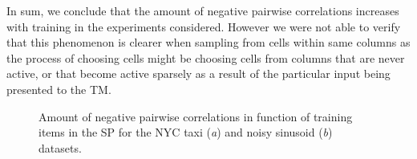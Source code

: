 \documentclass[11pt,letterpaper]{article}
\begin{document}
		    In sum, we conclude that the amount of negative pairwise correlations
		    increases with training in the experiments considered.
		    However we were not able to verify that this phenomenon is clearer when sampling
		    from cells within same columns as the process of choosing cells might be
		    choosing cells from columns that are never active, or that become active sparsely
		    as a result of the particular input being presented to the TM.

		    \begin{figure}[t]
			    \centering
			    \caption{
			        Amount of negative pairwise correlations in function of training items
			        in the SP for the NYC taxi (\emph{a}) and noisy sinusoid (\emph{b}) datasets.
			    }
			    \label{fig24}
		    \end{figure}
		    
\end{document}
